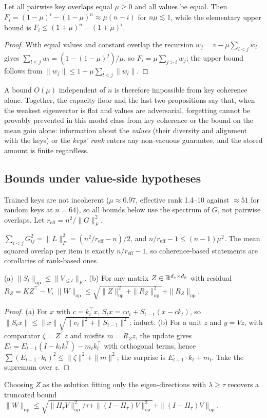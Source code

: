 \begin{proposition}\label{prop:coh}
Let all pairwise key overlaps equal $\mu\ge0$ and all values be equal. Then $F_i=(1-\mu)^i-(1-\mu)^n\approx\mu(n-i)$ for $n\mu\lesssim1$, while the elementary upper bound is $F_i\le(1+\mu)^n-(1+\mu)^i$.
\end{proposition}
\begin{proof}
With equal values and constant overlap the recursion $w_j=v-\mu\sum_{l<j}w_l$ gives $\sum_{l\le j}w_l=(1-(1-\mu)^j)/\mu$, so $F_i=\mu\sum_{j>i}w_j$; the upper bound follows from $\|w_j\|\le1+\mu\sum_{l<j}\|w_l\|$.
\end{proof}
A bound $O(\mu)$ independent of $n$ is therefore impossible from key coherence alone. Together, the capacity floor and the last two propositions say that, when the weakest eigenvector is flat and values are adversarial, forgetting cannot be provably prevented in this model class from key coherence or the bound on the mean gain alone: information about the \emph{values} (their diversity and alignment with the keys) or the \emph{keys' rank} enters any non-vacuous guarantee, and the stored amount is finite regardless.

\subsection{Bounds under value-side hypotheses}
Trained keys are not incoherent ($\mu\approx0.97$, effective rank 1.4--10 against $\approx51$ for random keys at $n=64$), so all bounds below use the spectrum of $G$, not pairwise overlaps. Let $r_{\mathrm{eff}}=n^2/\|G\|_F^2$.
\begin{proposition}\label{prop:overlap}
$\sum_{i<j}G_{ij}^2=\|L\|_F^2=(n^2/r_{\mathrm{eff}}-n)/2$, and $n/r_{\mathrm{eff}}-1\le(n-1)\mu^2$. The mean squared overlap per item is exactly $n/r_{\mathrm{eff}}-1$, so coherence-based statements are corollaries of rank-based ones.
\end{proposition}
\begin{lemma}\label{lem:budget}
(a) $\|S_t\|_{\mathrm{op}}\le\|V_{\le t}\|_F$. (b) For any matrix $Z\in\mathbb{R}^{d_v\times d_k}$ with residual $R_Z=KZ^\top-V$, $\|W\|_{\mathrm{op}}\le\sqrt{\|Z\|_{\mathrm{op}}^2+\|R_Z\|_{\mathrm{op}}^2}+\|R_Z\|_{\mathrm{op}}$.
\end{lemma}
\begin{proof}
(a) For $x$ with $c=k_t^\top x$, $S_tx=cv_t+S_{t-1}(x-ck_t)$, so $\|S_tx\|\le\|x\|\sqrt{\|v_t\|^2+\|S_{t-1}\|^2}$; induct. (b) For a unit $z$ and $y=Vz$, with comparator $\zeta=Z^\top z$ and misfits $m=R_Zz$, the update gives $E_t=E_{t-1}(I-k_tk_t^\top)-m_tk_t^\top$ with orthogonal terms, hence $\sum(E_{t-1}\cdot k_t)^2\le\|\zeta\|^2+\|m\|^2$; the surprise is $E_{t-1}\cdot k_t+m_t$. Take the supremum over $z$.
\end{proof}
Choosing $Z$ as the solution fitting only the eigen-directions with $\lambda\ge\tau$ recovers a truncated bound $\|W\|_{\mathrm{op}}\le\sqrt{\|\Pi_\tau V\|_{\mathrm{op}}^2/\tau+\|(I-\Pi_\tau)V\|_{\mathrm{op}}^2}+\|(I-\Pi_\tau)V\|_{\mathrm{op}}$.

